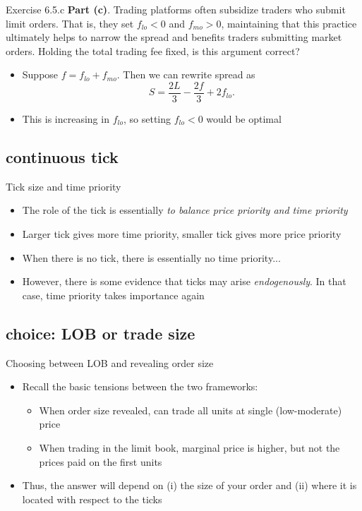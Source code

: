 \documentclass[english,10pt]{beamer}
\begin{document}
\begin{frame}{Exercise 6.5.c}
	\textbf{Part (c)}. Trading platforms often subsidize traders who submit limit orders. That is, they set $f_{lo}<0$ and $f_{mo}>0$, maintaining that this practice ultimately helps to narrow the spread and benefits traders submitting market orders. Holding the total trading fee fixed, is this argument correct?
	\smallskip
	\smallskip
	\begin{itemize}
		\item Suppose $f=f_{lo}+f_{mo}$. Then we can rewrite spread as
		\[
		S=\frac{2L}{3}-\frac{2f}{3}+2f_{lo}.
		\]
		\item This is increasing in $f_{lo}$, so setting $f_{lo}<0$ would be optimal
	\end{itemize}
\end{frame}


\subsection{continuous tick}

\begin{frame}{Tick size and time priority}
	\begin{itemize}
		\item The role of the tick is essentially \textit{to balance price priority and time priority}
		\pause
		\item Larger tick gives more time priority, smaller tick gives more price priority
		\pause
		\item When there is no tick, there is essentially no time priority...
		\pause
		\item However, there is some evidence that ticks may arise \textit{endogenously}. In that case, time priority takes importance again
	\end{itemize}
\end{frame}



\subsection{choice: LOB or trade size} 

\begin{frame}{Choosing between LOB and revealing order size}
	\begin{itemize}
		\item Recall the basic tensions between the two frameworks: 
		\pause
		\begin{itemize}
			\item When order size revealed, can trade all units at single (low-moderate) price
			\pause
			\item When trading in the limit book, marginal price is higher, but not the prices paid on the first units
		\end{itemize}
		\pause
		\item Thus, the answer will depend on (i) the size of your order and (ii) where it is located with respect to the ticks
	\end{itemize}
\end{frame}
\end{document}
